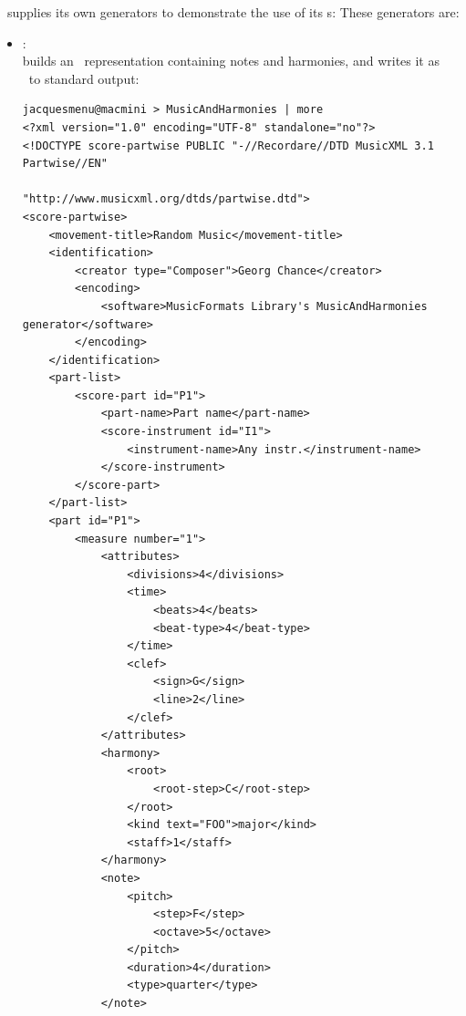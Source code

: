 \mf\ supplies its own generators to demonstrate the use of its \API s:
%
These generators are:
\begin{itemize}
\item {}: \\
builds an \mxsrRepr\ representation containing notes and harmonies, and writes it as \mxml\ to standard output:
\begin{lstlisting}[language=MusicXML]
jacquesmenu@macmini > MusicAndHarmonies | more
<?xml version="1.0" encoding="UTF-8" standalone="no"?>
<!DOCTYPE score-partwise PUBLIC "-//Recordare//DTD MusicXML 3.1 Partwise//EN"
                        "http://www.musicxml.org/dtds/partwise.dtd">
<score-partwise>
    <movement-title>Random Music</movement-title>
    <identification>
        <creator type="Composer">Georg Chance</creator>
        <encoding>
            <software>MusicFormats Library's MusicAndHarmonies generator</software>
        </encoding>
    </identification>
    <part-list>
        <score-part id="P1">
            <part-name>Part name</part-name>
            <score-instrument id="I1">
                <instrument-name>Any instr.</instrument-name>
            </score-instrument>
        </score-part>
    </part-list>
    <part id="P1">
        <measure number="1">
            <attributes>
                <divisions>4</divisions>
                <time>
                    <beats>4</beats>
                    <beat-type>4</beat-type>
                </time>
                <clef>
                    <sign>G</sign>
                    <line>2</line>
                </clef>
            </attributes>
            <harmony>
                <root>
                    <root-step>C</root-step>
                </root>
                <kind text="FOO">major</kind>
                <staff>1</staff>
            </harmony>
            <note>
                <pitch>
                    <step>F</step>
                    <octave>5</octave>
                </pitch>
                <duration>4</duration>
                <type>quarter</type>
            </note>


\end{lstlisting}
\end{itemize}
